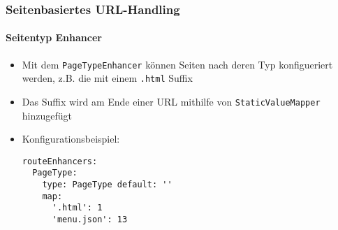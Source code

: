 \begin{frame}[fragile]
	\frametitle{Seitenbasiertes URL-Handling}
	\framesubtitle{Seitentyp Enhancer}

	\lstset{basicstyle=\smaller\ttfamily}

	\begin{itemize}
		\item Mit dem \texttt{PageTypeEnhancer} können Seiten nach deren Typ konfigueriert werden,
			z.B. die mit einem  \texttt{.html} Suffix
		\item Das Suffix wird am Ende einer URL mithilfe von
			\texttt{StaticValueMapper} hinzugefügt
		\item Konfigurationsbeispiel:

\begin{lstlisting}
routeEnhancers:
  PageType:
    type: PageType default: ''
	map:
	  '.html': 1
	  'menu.json': 13
\end{lstlisting}

	\end{itemize}

\end{frame}

